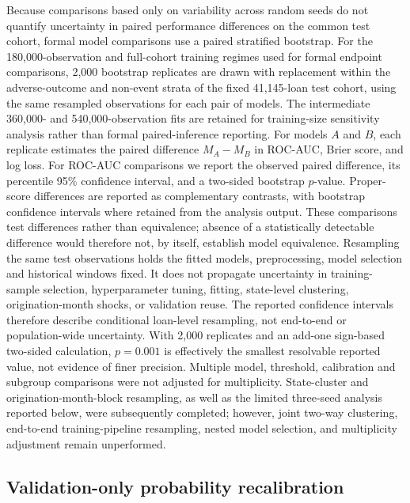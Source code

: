 \documentclass[10pt]{article}
\begin{document}
Because comparisons based only on variability across random seeds do not quantify uncertainty in paired performance differences on the common test cohort, formal model comparisons use a paired stratified bootstrap. For the 180,000-observation and full-cohort training regimes used for formal endpoint comparisons, 2,000 bootstrap replicates are drawn with replacement within the adverse-outcome and non-event strata of the fixed 41,145-loan test cohort, using the same resampled observations for each pair of models. The intermediate 360,000- and 540,000-observation fits are retained for training-size sensitivity analysis rather than formal paired-inference reporting. For models $A$ and $B$, each replicate estimates the paired difference $M_A-M_B$ in ROC-AUC, Brier score, and log loss. For ROC-AUC comparisons we report the observed paired difference, its percentile 95\% confidence interval, and a two-sided bootstrap $p$-value. Proper-score differences are reported as complementary contrasts, with bootstrap confidence intervals where retained from the analysis output. These comparisons test differences rather than equivalence; absence of a statistically detectable difference would therefore not, by itself, establish model equivalence. Resampling the same test observations holds the fitted models, preprocessing, model selection and historical windows fixed. It does not propagate uncertainty in training-sample selection, hyperparameter tuning, fitting, state-level clustering, origination-month shocks, or validation reuse. The reported confidence intervals therefore describe conditional loan-level resampling, not end-to-end or population-wide uncertainty. With 2,000 replicates and an add-one sign-based two-sided calculation, \(p=0.001\) is effectively the smallest resolvable reported value, not evidence of finer precision. Multiple model, threshold, calibration and subgroup comparisons were not adjusted for multiplicity. State-cluster and origination-month-block resampling, as well as the limited three-seed analysis reported below, were subsequently completed; however, joint two-way clustering, end-to-end training-pipeline resampling, nested model selection, and multiplicity adjustment remain unperformed.


\subsection{Validation-only probability recalibration}
\end{document}
